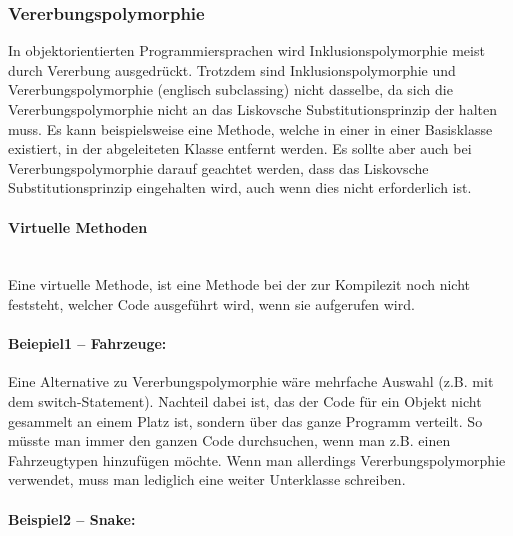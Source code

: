 		\subsubsection{Vererbungspolymorphie}
			In objektorientierten Programmiersprachen wird Inklusionspolymorphie meist durch Vererbung ausgedrückt.
			Trotzdem sind Inklusionspolymorphie und Vererbungspolymorphie (englisch subclassing) nicht dasselbe, da sich
			die Vererbungspolymorphie nicht an das Liskovsche Substitutionsprinzip der halten muss. Es kann beispielsweise
			eine Methode, welche in einer in einer Basisklasse existiert, in der abgeleiteten Klasse entfernt werden. Es
			sollte aber auch bei Vererbungspolymorphie darauf geachtet werden, dass das Liskovsche Substitutionsprinzip
			eingehalten wird, auch wenn dies nicht erforderlich ist.
			
			\paragraph{Virtuelle Methoden}\mbox{}\\
				Eine virtuelle Methode, ist eine Methode bei der zur Kompilezit noch nicht feststeht, welcher Code ausgeführt
				wird, wenn sie aufgerufen wird.
			
			\paragraph*{Beiepiel1 -- Fahrzeuge:}\mbox{}
			
				\UseRawInputEncoding{}
				Eine Alternative zu Vererbungspolymorphie wäre mehrfache Auswahl (z.B. mit dem switch-Statement). Nachteil dabei
				ist, das der Code für ein Objekt nicht gesammelt an einem Platz ist, sondern über das ganze Programm verteilt.
				So müsste man immer den ganzen Code durchsuchen, wenn man z.B. einen Fahrzeugtypen hinzufügen möchte. Wenn man
				allerdings Vererbungspolymorphie verwendet, muss man lediglich eine weiter Unterklasse schreiben.
				
				\UseRawInputEncoding{}
				
			
			\paragraph*{Beispiel2 -- Snake:}\mbox{}
			
